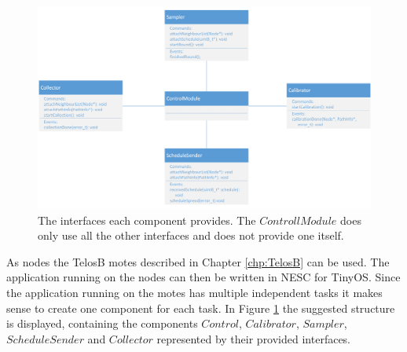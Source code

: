 \begin{figure}[htbp]
	\centering
    \includegraphics[scale=0.6]{content/images/Motes/GeneralStructure}
   	\caption{The interfaces each component provides. The $ControllModule$ does only use all the other interfaces and does not provide one itself.}
    \label{fig:moteStructure}
\end{figure}

As nodes the TelosB motes described in Chapter \ref{chp:TelosB} can be used. The application running on the nodes can then be written in NESC for TinyOS. Since the application running on the motes has multiple independent tasks it makes sense to create one component for each task. In Figure \ref{fig:moteStructure} the suggested structure is displayed, containing the components $Control$, $Calibrator$, $Sampler$, $ScheduleSender$ and $Collector$ represented by their provided interfaces. 

